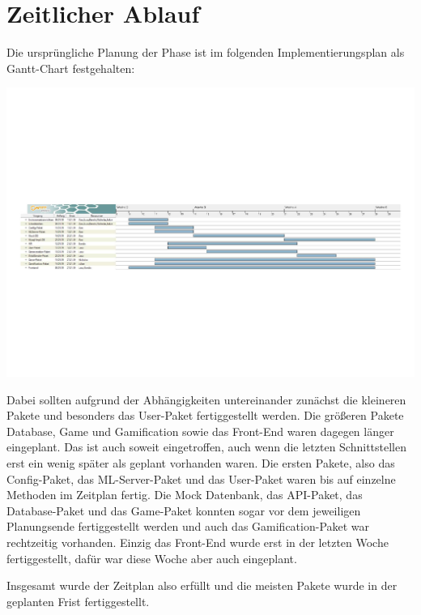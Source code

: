 \documentclass[a4paper]{scrreprt}
\begin{document}
\chapter{Zeitlicher Ablauf}
Die ursprüngliche Planung der Phase ist im folgenden Implementierungsplan als Gantt-Chart festgehalten:

\includegraphics[width=\linewidth]{img/gantt.pdf} %

Dabei sollten aufgrund der Abhängigkeiten untereinander zunächst die kleineren Pakete und besonders das User-Paket fertiggestellt werden. Die größeren Pakete Database, Game und Gamification sowie das Front-End waren dagegen länger eingeplant. Das ist auch soweit eingetroffen, auch wenn die letzten Schnittstellen erst ein wenig später als geplant vorhanden waren. Die ersten Pakete, also das Config-Paket, das ML-Server-Paket und das User-Paket waren bis auf einzelne Methoden im Zeitplan fertig. Die Mock Datenbank, das API-Paket, das Database-Paket und das Game-Paket konnten sogar vor dem jeweiligen Planungsende fertiggestellt werden und auch das Gamification-Paket war rechtzeitig vorhanden. Einzig das Front-End wurde erst in der letzten Woche fertiggestellt, dafür war diese Woche aber auch eingeplant.

\hspace{1cm}

Insgesamt wurde der Zeitplan also erfüllt und die meisten Pakete wurde in der geplanten Frist fertiggestellt.
\end{document}
